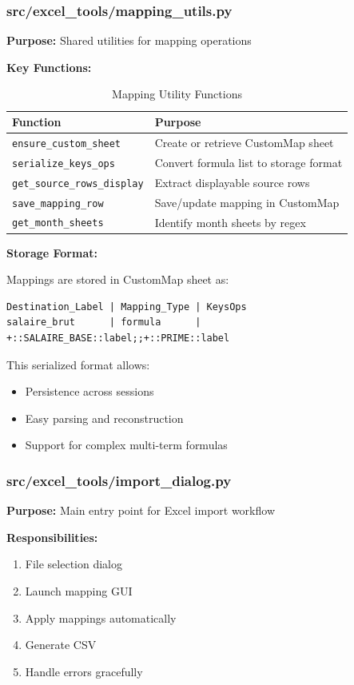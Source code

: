 \subsubsection{src/excel\_tools/mapping\_utils.py}

\textbf{Purpose:} Shared utilities for mapping operations

\textbf{Key Functions:}

\begin{table}[H]
\centering
\begin{tabularx}{\textwidth}{lX}
\toprule
\textbf{Function} & \textbf{Purpose} \\
\midrule
\texttt{ensure\_custom\_sheet} & Create or retrieve CustomMap sheet \\
\texttt{serialize\_keys\_ops} & Convert formula list to storage format \\
\texttt{get\_source\_rows\_display} & Extract displayable source rows \\
\texttt{save\_mapping\_row} & Save/update mapping in CustomMap \\
\texttt{get\_month\_sheets} & Identify month sheets by regex \\
\bottomrule
\end{tabularx}
\caption{Mapping Utility Functions}
\end{table}

\textbf{Storage Format:}

Mappings are stored in CustomMap sheet as:
\begin{lstlisting}
Destination_Label | Mapping_Type | KeysOps
salaire_brut      | formula      | +::SALAIRE_BASE::label;;+::PRIME::label
\end{lstlisting}

This serialized format allows:
\begin{itemize}
    \item Persistence across sessions
    \item Easy parsing and reconstruction
    \item Support for complex multi-term formulas
\end{itemize}

\subsubsection{src/excel\_tools/import\_dialog.py}

\textbf{Purpose:} Main entry point for Excel import workflow

\textbf{Responsibilities:}
\begin{enumerate}
    \item File selection dialog
    \item Launch mapping GUI
    \item Apply mappings automatically
    \item Generate CSV
    \item Handle errors gracefully
\end{enumerate}

